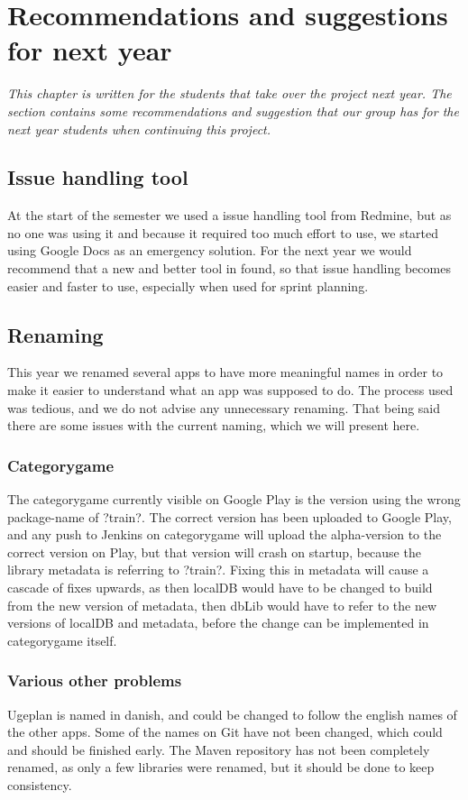 \chapter{Recommendations and suggestions for next year}
\textit{This chapter is written for the students that take over the project next year. The section contains some recommendations and suggestion that our group has for the next year students when continuing this project.}

\section{Issue handling tool}
At the start of the semester we used a issue handling tool from Redmine, but as no one was using it and because it required too much effort to use, we started using Google Docs as an emergency solution. For the next year we would recommend that a new and better tool in found, so that issue handling becomes easier and faster to use, especially when used for sprint planning.

\section{Renaming}
This year we renamed several apps to have more meaningful names in order to make it easier to understand what an app was supposed to do. The process used was tedious, and we do not advise any unnecessary renaming. That being said there are some issues with the current naming, which we will present here.

\subsection{Categorygame}
The categorygame currently visible on Google Play is the version using the wrong package-name of ?train?. The correct version has been uploaded to Google Play, and any push to Jenkins on categorygame will upload the alpha-version to the correct version on Play, but that version will crash on startup, because the library metadata is referring to ?train?. Fixing this in metadata will cause a cascade of fixes upwards, as then localDB would have to be changed to build from the new version of metadata, then dbLib would have to refer to the new versions of localDB and metadata, before the change can be implemented in categorygame itself.

\subsection{Various other problems}
Ugeplan is named in danish, and could be changed to follow the english names of the other apps.
Some of the names on Git have not been changed, which could and should be finished early.
The Maven repository has not been completely renamed, as only a few libraries were renamed, but it should be done to keep consistency.

